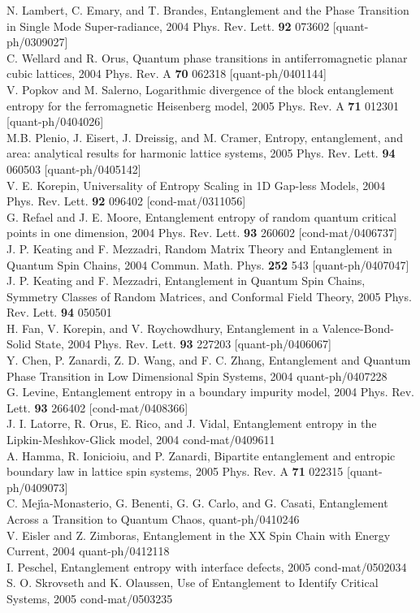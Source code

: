\documentclass[12pt,preprint,tighten,eqsecnum,aps,floats,psfig,epsfig,amsmath,onecolumn]{revtex4-1}
\begin{document}
{\begin{thebibliography}{99}
%
N. Lambert, C. Emary, and T. Brandes,
Entanglement and the Phase Transition in Single Mode Super-radiance,
2004 Phys. Rev. Lett. {\bf 92} 073602 [quant-ph/0309027]\\
C. Wellard and R. Orus, Quantum phase transitions in antiferromagnetic 
planar cubic lattices, 2004 Phys. Rev. A {\bf 70} 062318 [quant-ph/0401144]\\
V. Popkov and M. Salerno, Logarithmic divergence of the block entanglement 
entropy for the ferromagnetic Heisenberg model, 
2005 Phys. Rev. A {\bf 71} 012301 [quant-ph/0404026]\\
M.B. Plenio, J. Eisert, J. Dreissig, and M. Cramer, 
Entropy, entanglement, and area: analytical results for harmonic lattice 
systems, 2005 Phys. Rev. Lett. {\bf 94} 060503 [quant-ph/0405142]\\
V. E. Korepin, Universality of Entropy Scaling in 1D Gap-less Models,
2004 Phys. Rev. Lett. {\bf 92} 096402 [cond-mat/0311056]\\
G. Refael and  J. E. Moore, 
Entanglement entropy of random quantum critical points in one dimension,
2004 Phys. Rev. Lett. {\bf 93} 260602 [cond-mat/0406737]\\
J. P. Keating and F. Mezzadri,
Random Matrix Theory and Entanglement in Quantum Spin Chains,
2004 Commun. Math. Phys. {\bf 252} 543 [quant-ph/0407047]\\
J. P. Keating and F. Mezzadri,
Entanglement in Quantum Spin Chains, Symmetry Classes of Random Matrices, 
and Conformal Field Theory,
2005 Phys. Rev. Lett. {\bf 94} 050501\\
H. Fan, V. Korepin, and V. Roychowdhury,
Entanglement in a Valence-Bond-Solid State,
2004 Phys. Rev. Lett. {\bf 93} 227203 [quant-ph/0406067]\\
Y. Chen, P. Zanardi, Z. D. Wang, and F. C. Zhang,
Entanglement and Quantum Phase Transition in Low Dimensional Spin Systems,
2004 quant-ph/0407228\\
G. Levine, Entanglement entropy in a boundary impurity model,
2004 Phys. Rev. Lett. {\bf 93} 266402 [cond-mat/0408366]\\
J. I. Latorre, R. Orus, E. Rico, and J. Vidal,
Entanglement entropy in the Lipkin-Meshkov-Glick model,
2004 cond-mat/0409611\\
A. Hamma, R. Ionicioiu, and P. Zanardi,
Bipartite entanglement and entropic boundary law in lattice spin systems,
2005 Phys. Rev. A {\bf 71} 022315 [quant-ph/0409073]\\
C. Mej\'{\i}a-Monasterio, G. Benenti, G. G. Carlo, and G. Casati,
Entanglement Across a Transition to Quantum Chaos, quant-ph/0410246\\
V. Eisler and Z. Zimboras, 
Entanglement in the XX Spin Chain with Energy Current, 
2004 quant-ph/0412118\\
I. Peschel, Entanglement entropy with interface defects, 
2005 cond-mat/0502034\\
S. O. Skrovseth and K. Olaussen, 
Use of Entanglement to Identify Critical Systems, 2005 cond-mat/0503235


\end{thebibliography}}
\end{document}
